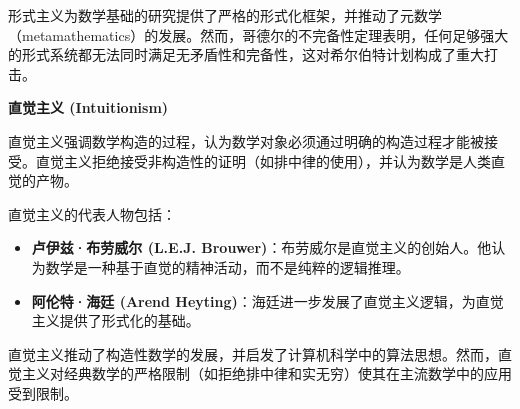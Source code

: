 \documentclass[12pt, a4paper, oneside, UTF8]{ctexbook}  %
\begin{document}
\begin{add}
形式主义为数学基础的研究提供了严格的形式化框架，并推动了元数学（metamathematics）的发展。然而，哥德尔的不完备性定理表明，任何足够强大的形式系统都无法同时满足无矛盾性和完备性，这对希尔伯特计划构成了重大打击。

\textbf{直觉主义 (Intuitionism)}

直觉主义强调数学构造的过程，认为数学对象必须通过明确的构造过程才能被接受。直觉主义拒绝接受非构造性的证明（如排中律的使用），并认为数学是人类直觉的产物。

直觉主义的代表人物包括：
\begin{itemize}
    \item \textbf{卢伊兹·布劳威尔 (L.E.J. Brouwer)}：布劳威尔是直觉主义的创始人。他认为数学是一种基于直觉的精神活动，而不是纯粹的逻辑推理。
    \item \textbf{阿伦特·海廷 (Arend Heyting)}：海廷进一步发展了直觉主义逻辑，为直觉主义提供了形式化的基础。
\end{itemize}

直觉主义推动了构造性数学的发展，并启发了计算机科学中的算法思想。然而，直觉主义对经典数学的严格限制（如拒绝排中律和实无穷）使其在主流数学中的应用受到限制。
\end{add}
\end{document}
